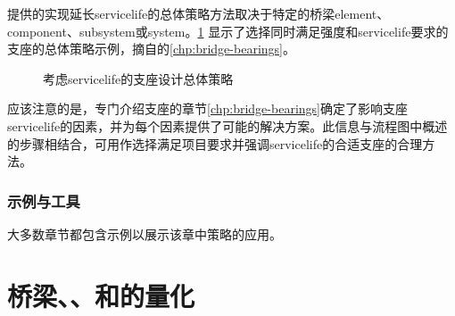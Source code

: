 提供的实现延长\gls*{servicelife}的总体策略方法取决于特定的桥梁\gls*{element}、\gls*{component}、\gls*{subsystem}或\gls*{system}。\cref{fig:overall-strategy-bearing} 显示了选择同时满足强度和\gls*{servicelife}要求的支座的总体策略示例，摘自的\cref{chp:bridge-bearings}。

\begin{figure}
  \caption{考虑\gls{servicelife}的支座设计总体策略}\label{fig:overall-strategy-bearing}
\end{figure}


应该注意的是，专门介绍支座的章节\cref{chp:bridge-bearings}确定了影响支座\gls{servicelife}的因素，并为每个因素提供了可能的解决方案。此信息与流程图中概述的步骤相结合，可用作选择满足项目要求并强调\gls{servicelife}的合适支座的合理方法。


\subsubsection*{示例与工具}

大多数章节都包含示例以展示该章中策略的应用。

\section{桥梁、、和的量化}

